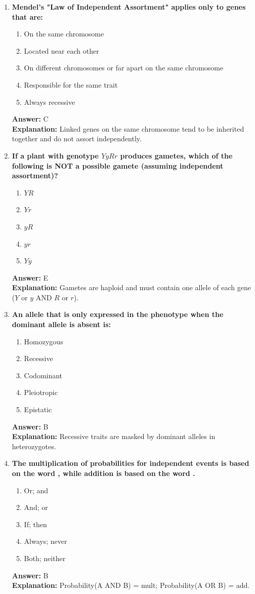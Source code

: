 \documentclass[11pt, a4paper]{article}
\begin{document}
\begin{enumerate}[leftmargin=*, label=\arabic*.]
\item \textbf{Mendel’s "Law of Independent Assortment" applies only to genes that are:}
\begin{enumerate}[label=\Alph*.]
\item On the same chromosome
\item Located near each other
\item On different chromosomes or far apart on the same chromosome
\item Responsible for the same trait
\item Always recessive
\end{enumerate}
\textbf{Answer:} C \\
\textbf{Explanation:} Linked genes on the same chromosome tend to be inherited together and do not assort independently.

\item \textbf{If a plant with genotype $YyRr$ produces gametes, which of the following is NOT a possible gamete (assuming independent assortment)?}
\begin{enumerate}[label=\Alph*.]
\item $YR$
\item $Yr$
\item $yR$
\item $yr$
\item $Yy$
\end{enumerate}
\textbf{Answer:} E \\
\textbf{Explanation:} Gametes are haploid and must contain one allele of each gene ($Y$ or $y$ AND $R$ or $r$).

\item \textbf{An allele that is only expressed in the phenotype when the dominant allele is absent is:}
\begin{enumerate}[label=\Alph*.]
\item Homozygous
\item Recessive
\item Codominant
\item Pleiotropic
\item Epistatic
\end{enumerate}
\textbf{Answer:} B \\
\textbf{Explanation:} Recessive traits are masked by dominant alleles in heterozygotes.

\item \textbf{The multiplication of probabilities for independent events is based on the word \underline{\hspace{1cm}}, while addition is based on the word \underline{\hspace{1cm}}.}
\begin{enumerate}[label=\Alph*.]
\item Or; and
\item And; or
\item If; then
\item Always; never
\item Both; neither
\end{enumerate}
\textbf{Answer:} B \\
\textbf{Explanation:} Probability(A AND B) = mult; Probability(A OR B) = add.


\end{enumerate}
\end{document}
